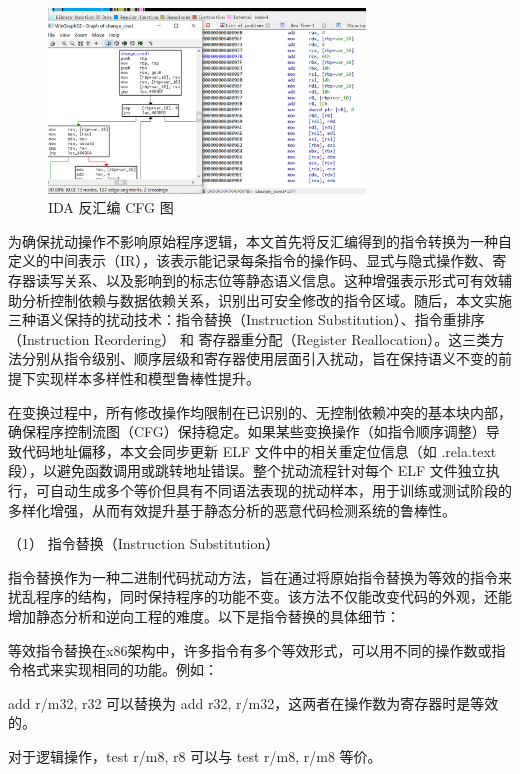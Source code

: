 \begin{figure}[hbt]
	\centering
	\includegraphics[width=0.75\textwidth]{figures/4.1}
	\caption{IDA 反汇编 CFG 图}\label{fig:4.1}
\end{figure}


为确保扰动操作不影响原始程序逻辑，本文首先将反汇编得到的指令转换为一种自定义的中间表示（IR），该表示能记录每条指令的操作码、显式与隐式操作数、寄存器读写关系、以及影响到的标志位等静态语义信息。这种增强表示形式可有效辅助分析控制依赖与数据依赖关系，识别出可安全修改的指令区域。随后，本文实施三种语义保持的扰动技术：指令替换（Instruction Substitution）、指令重排序（Instruction Reordering） 和 寄存器重分配（Register Reallocation）。这三类方法分别从指令级别、顺序层级和寄存器使用层面引入扰动，旨在保持语义不变的前提下实现样本多样性和模型鲁棒性提升。

在变换过程中，所有修改操作均限制在已识别的、无控制依赖冲突的基本块内部，确保程序控制流图（CFG）保持稳定。如果某些变换操作（如指令顺序调整）导致代码地址偏移，本文会同步更新 ELF 文件中的相关重定位信息（如 .rela.text 段），以避免函数调用或跳转地址错误。整个扰动流程针对每个 ELF 文件独立执行，可自动生成多个等价但具有不同语法表现的扰动样本，用于训练或测试阶段的多样化增强，从而有效提升基于静态分析的恶意代码检测系统的鲁棒性。

（1） 指令替换（Instruction Substitution）

指令替换作为一种二进制代码扰动方法，旨在通过将原始指令替换为等效的指令来扰乱程序的结构，同时保持程序的功能不变。该方法不仅能改变代码的外观，还能增加静态分析和逆向工程的难度。以下是指令替换的具体细节：

等效指令替换在x86架构中，许多指令有多个等效形式，可以用不同的操作数或指令格式来实现相同的功能。例如：

add r/m32, r32 可以替换为 add r32, r/m32，这两者在操作数为寄存器时是等效的。

对于逻辑操作，test r/m8, r8 可以与 test r/m8, r/m8 等价。

